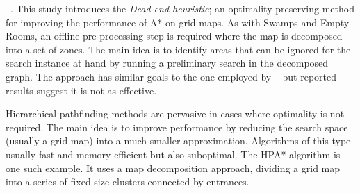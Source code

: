 \citeauthor{bjornsson06}~.  This study introduces the
\emph{Dead-end heuristic}; an optimality preserving
 method for improving the performance of A* on grid maps.
As with Swamps and Empty Rooms, an offline pre-processing step is required where
the map is decomposed into a set of zones.  The main idea is to identify areas
that can be ignored for the search instance at hand by running a preliminary
search in the decomposed graph.  The approach has similar goals to the one
employed by \citeauthor{pochter10}~ but reported results
suggest it is not as effective.
\par
Hierarchical pathfinding methods are pervasive in cases where optimality is
not required.  The main idea is to improve performance by reducing the 
search space (usually a grid map) into a much smaller approximation.  Algorithms
of this type usually fast and memory-efficient but also suboptimal.  The HPA*
algorithm \cite{botea04} is one such example.  It uses a map decomposition
approach, dividing a grid map into a series of fixed-size clusters connected by
entrances.
